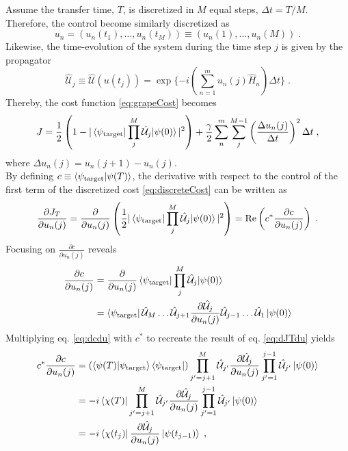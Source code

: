 Assume the transfer time, $T$, is discretized in $M$ equal steps, $\Delta t = T/M$. Therefore, the control become similarly discretized as
\begin{equation}
	u_n = \left( u_n (t_1) , \ldots , u_n (t_M)  \right) \equiv \left( u_n (1) , \ldots , u_n (M)  \right) \; .
\end{equation}
Likewise, the time-evolution of the system during the time step $j$ is given by the propagator
\begin{equation}
	\hat{\mathcal{U}}_j \equiv \hat{\mathcal{U}} (u(t_j)) = \exp \lbrace -i \left(  \sum_{n = 1}^{m} u_n(j) \hat{H}_n  \right) \Delta t \rbrace \; . 
\end{equation} 
Thereby, the cost function \eqref{eq:grapeCost} becomes
\begin{equation}
	J = \frac{1}{2} \left( 1 - |\braket{\psi_{\mathrm{target}} | \prod_{j}^{M} \hat{\mathcal{U}}_j | \psi (0)}|^2 \right) + \frac{\gamma}{2} \sum_{n}^{m} \sum_{j}^{M-1} \left( \frac{\Delta u_n (j)}{\Delta t} \right)^2 \Delta t \; ,
	\label{eq:discreteCost}
\end{equation}
where $\Delta u_n (j) =  u_n (j+1) - u_n (j)$.\\
By defining $c \equiv \braket{\psi_{\mathrm{target}} | \psi (T)}$, the derivative with respect to the control of the first term of the discretized cost \eqref{eq:discreteCost} can be written as 
\begin{equation}
	\frac{\partial J_T}{\partial u_n (j)} = \frac{\partial}{\partial u_n (j)} \left( \frac{1}{2} |\braket{\psi_{\mathrm{target}} | \prod_{j}^{M} \hat{\mathcal{U}}_j | \psi (0)}|^2  \right) = \Re \left( c^* \frac{\partial c}{\partial u_n (j)} \right) \; .
	\label{eq:dJTdu}
\end{equation}
Focusing on $\frac{\partial c}{\partial u_n (j)}$ reveals
\begin{align}
	\frac{\partial c}{\partial u_n (j)} &= \frac{\partial }{\partial u_n (j)} \braket{\psi_{\mathrm{target}} | \prod_{j}^{M} \hat{\mathcal{U}}_j | \psi (0)} \nonumber \\
	&= \bra{\psi_{\mathrm{target}}} \hat{\mathcal{U}}_M \ldots \hat{\mathcal{U}}_{j+1} \frac{\partial \hat{\mathcal{U}}_{j}}{\partial u_n (j)} \hat{\mathcal{U}}_{j-1} \ldots \hat{\mathcal{U}}_{1} \ket{\psi (0)}
	\label{eq:dcdu}
\end{align}
Multiplying eq. \eqref{eq:dcdu} with $c^*$ to recreate the result of eq. \eqref{eq:dJTdu} yields
\begin{align}
	c^* \frac{\partial c}{\partial u_n (j)} &= \left( \braket{\psi(T) | \psi_{\mathrm{target}}} \bra{\psi_{\mathrm{target}}} \right) \prod_{j' = j +1}^{M} \hat{\mathcal{U}}_{j '} \frac{\partial \hat{\mathcal{U}}_{j}}{\partial u_n (j)} \prod_{j' = 1}^{ j-1} \hat{\mathcal{U}}_{j '} \ket{\psi (0)} \\
	&= -i \bra{\chi (T)} \prod_{j' = j +1}^{M} \hat{\mathcal{U}}_{j '} \frac{\partial \hat{\mathcal{U}}_{j}}{\partial u_n (j)} \prod_{j' = 1}^{ j-1} \hat{\mathcal{U}}_{j '} \ket{\psi (0)} \\
	&= -i \bra{\chi (t_j)}  \frac{\partial \hat{\mathcal{U}}_{j}}{\partial u_n (j)} \ket{\psi (t_{j-1})} \; ,
	\label{eq:gradientForBack}
\end{align}
